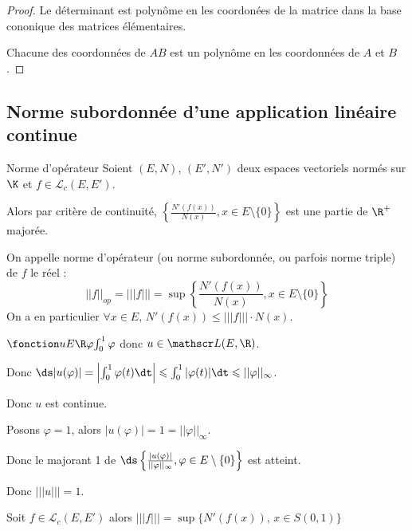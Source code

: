 \begin{proof}
    Le déterminant est polynôme en les coordonées de la matrice dans la base cononique des 
    matrices élémentaires. 

    \svspace Chacune des coordonnées de $AB$ est un polynôme en les coordonnées de $A$ et $B$.
\end{proof}

\subsection{Norme subordonnée d'une application linéaire continue}

\begin{definition}{Norme d'opérateur}{}
    Soient $(E, N)$, $(E', N')$ deux espaces vectoriels normés sur $\K$ et $f \in \mathscr L_c(E, E')$.

    \avspace Alors par critère de continuité, $\left\{ \frac{N'(f(x))}{N(x)}, x \in E \setminus \{0\} \right\}$ est
    une partie de $\R^+$ majorée. 

    On appelle norme d'opérateur (ou norme subordonnée, ou parfois norme triple) de $f$ le réel : 
    \[||f||_{op} = |||f||| = \sup \left\{\frac{N'(f(x))}{N(x)}, x \in E \setminus \{0\} \right\}\]
    On a en particulier $\forall x \in E, \, N'(f(x)) \leqslant |||f||| \cdot N(x)$.
\end{definition}

\begin{exemple}
    $\fonction u E \R \varphi {\int_0^1 \varphi}$ donc $u \in \mathscr L(E, \R)$. 

    \avspace Donc $\ds |u(\varphi)| = \left| \int_0^1 \varphi(t) \dt \right| \leqslant \int_0^1 |\varphi(t)| \dt \leqslant ||\varphi||_\infty$.

    Donc $u$ est continue. 

    Posons $\varphi = 1$, alors $|u(\varphi)| = 1 = ||\varphi||_\infty$.

    Donc le majorant 1 de $\ds \left\{ \frac{|u(\varphi)|}{||\varphi||_\infty}, \varphi \in E \setminus \{0\} \right\}$ est atteint. 

    Donc $|||u||| = 1$.
\end{exemple}

\begin{proposition}{}{}
    Soit $f \in \mathscr L_c(E, E')$ alors $|||f||| = \sup \{ N'(f(x)), \, x \in S(0, 1) \}$
\end{proposition}

